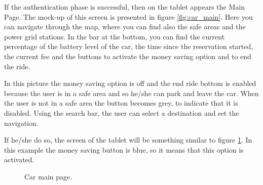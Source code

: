 If the authentication phase is successful, then on the tablet appears the Main Page. The mock-up of this screen is presented in figure \ref{fig:car_main}. Here you can navigate through the map, where you can find also the safe areas and the power grid stations. In the bar at the bottom, you can find the current percentage of the battery level of the car, the time since the reservation started, the current fee and the buttons to activate the money saving option and to end the ride.

In this picture the money saving option is off and the end ride bottom is enabled because the user is in a safe area and so he/she can park and leave the car. When the user is not in a safe area the button becomes grey, to indicate that it is disabled. Using the search bar, the user can select a destination and set the navigation.

If he/she do so, the screen of the tablet will be something similar to figure \ref{fig:car_ride}. In this example the money saving button is blue, so it means that this option is activated.

\begin{figure}
    \vspace*{-2cm}
    \caption{Car main page.}
	\label{fig:car_ride}
\end{figure}
